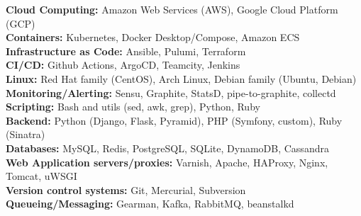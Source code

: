 \documentclass[margin,line]{resume}
\begin{document}
\begin{resume}
    \textbf{Cloud Computing:} Amazon Web Services (AWS), Google Cloud Platform (GCP)\\
    \textbf{Containers:} Kubernetes, Docker Desktop/Compose, Amazon ECS\\
    \textbf{Infrastructure as Code:} Ansible, Pulumi, Terraform\\
    \textbf{CI/CD:} Github Actions, ArgoCD, Teamcity, Jenkins\\
    \textbf{Linux:} Red Hat family (CentOS), Arch Linux, Debian family (Ubuntu, Debian)\\
    \textbf{Monitoring/Alerting:} Sensu, Graphite, StatsD, pipe-to-graphite, collectd\\
    \textbf{Scripting:} Bash and utils (sed, awk, grep), Python, Ruby\\
    \textbf{Backend:} Python (Django, Flask, Pyramid), PHP (Symfony, custom), Ruby (Sinatra)\\
    \textbf{Databases:} MySQL, Redis, PostgreSQL, SQLite, DynamoDB, Cassandra\\
    \textbf{Web Application servers/proxies:} Varnish, Apache, HAProxy, Nginx, Tomcat, uWSGI\\
    \textbf{Version control systems:} Git, Mercurial, Subversion\\
    \textbf{Queueing/Messaging:} Gearman, Kafka, RabbitMQ, beanstalkd

\end{resume}
\end{document}

